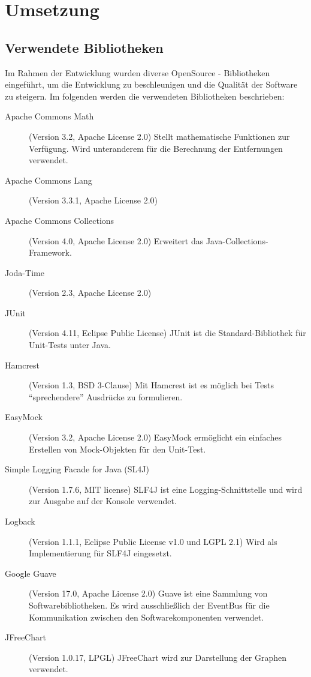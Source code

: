 \section{Umsetzung}

\subsection{Verwendete Bibliotheken}
Im Rahmen der Entwicklung wurden diverse OpenSource - Bibliotheken eingeführt, um die Entwicklung zu beschleunigen und die Qualität der Software zu steigern. Im folgenden werden die verwendeten Bibliotheken beschrieben:
\begin{description}
 \item[Apache Commons Math] (Version 3.2, Apache License 2.0) \cite{apache:CommonsMath} Stellt mathematische Funktionen zur Verfügung. Wird unteranderem für die Berechnung der Entfernungen verwendet.
 \item[Apache Commons Lang] (Version 3.3.1, Apache License 2.0) \cite{apache:CommonsLang} %
 \item[Apache Commons Collections] (Version 4.0, Apache License 2.0) \cite{apache:CommonsCollection} Erweitert das Java-Collec\-tions-Framework. 
 \item[Joda-Time] (Version 2.3, Apache License 2.0) \cite{joda:jodatime} %
 \item[JUnit] (Version 4.11, Eclipse Public License) \cite{junit:junit} JUnit ist die Standard-Bibliothek für Unit-Tests unter Java. 
 \item[Hamcrest] (Version 1.3, BSD 3-Clause) \cite{hamcrest:hamcrest} Mit Hamcrest ist es möglich bei Tests "`sprechendere"' Ausdrücke zu formulieren.
 \item[EasyMock] (Version 3.2, Apache License 2.0) \cite{easymock:easymock} EasyMock ermöglicht ein einfaches Erstellen von Mock-Objekten für den Unit-Test.
 \item[Simple Logging Facade for Java (SL4J)] (Version 1.7.6, MIT license) \cite{qos:slfj} SLF4J ist eine Logging-Schnittstelle und wird zur Ausgabe auf der Konsole verwendet.
 \item[Logback] (Version 1.1.1, Eclipse Public License v1.0 und LGPL 2.1) \cite{qos:logback} Wird als Implementierung für SLF4J eingesetzt.
 \item[Google Guave] (Version 17.0, Apache License 2.0) \cite{google:guave} Guave ist eine Sammlung von Softwarebibliotheken. Es wird ausschließlich der EventBus für die Kommunikation zwischen den Softwarekomponenten verwendet.
 \item[JFreeChart] (Version 1.0.17, LPGL) \cite{ObjectRefineryLimited:JFreeChart} JFreeChart wird zur Darstellung der Graphen verwendet.
\end{description}

